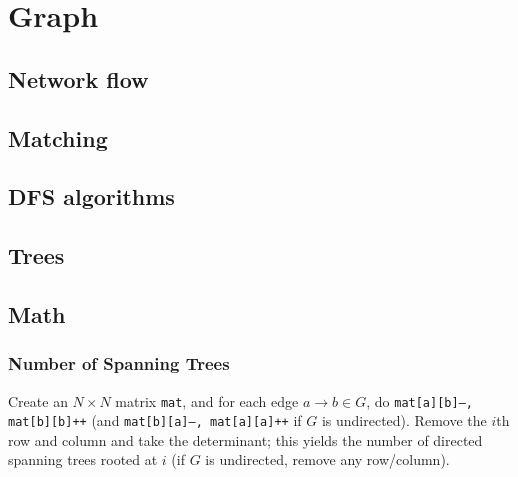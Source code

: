 \chapter{Graph}


\section{Network flow}

\section{Matching}

\section{DFS algorithms}



\section{Trees}

\section{Math}
	\subsection{Number of Spanning Trees}
		Create an $N\times N$ matrix \texttt{mat}, and for each edge $a \rightarrow b \in G$, do
		\texttt{mat[a][b]--, mat[b][b]++} (and \texttt{mat[b][a]--, mat[a][a]++} if $G$ is undirected).
		Remove the $i$th row and column and take the determinant; this yields the number of directed spanning trees rooted at $i$
		(if $G$ is undirected, remove any row/column).

